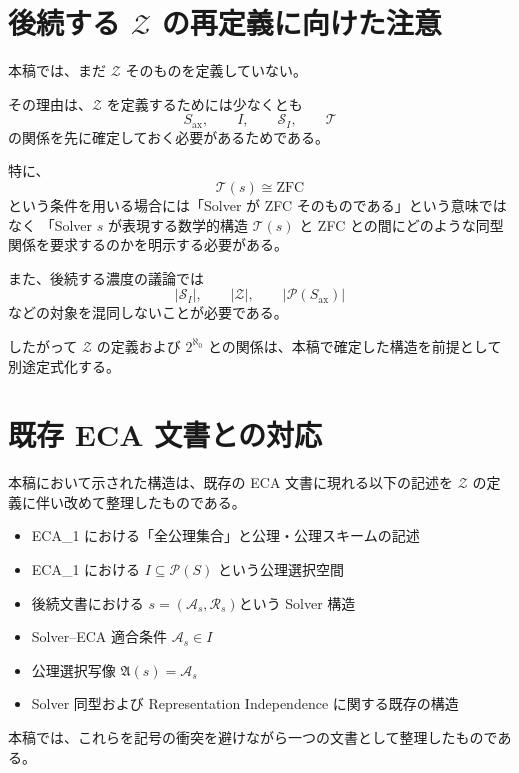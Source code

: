 \documentclass[a4paper,11pt]{jsarticle}
\newcommand{\Solver}{\mathcal{S}}
\newcommand{\Ax}{S_{\mathrm{ax}}}
\newcommand{\Sel}{I}
\begin{document}
\section{後続する $\mathcal{Z}$ の再定義に向けた注意}

本稿では、まだ $\mathcal{Z}$ そのものを定義していない。

その理由は、$\mathcal{Z}$ を定義するためには少なくとも
\[
\Ax,\qquad
\Sel,\qquad
\Solver_{\Sel},\qquad
\mathcal{T}
\]
の関係を先に確定しておく必要があるためである。

特に、
\[
\mathcal{T}(s)\cong\mathrm{ZFC}
\]
という条件を用いる場合には「Solver が ZFC そのものである」という意味ではなく 「Solver $s$ が表現する数学的構造 $\mathcal{T}(s)$ と ZFC との間にどのような同型関係を要求するのかを明示する必要がある。

また、後続する濃度の議論では
\[
|\Solver_{\Sel}|,
\qquad
|\mathcal{Z}|,
\qquad
|\mathcal{P}(\Ax)|
\]
などの対象を混同しないことが必要である。

したがって $\mathcal{Z}$ の定義および $2^{\aleph_0}$ との関係は、本稿で確定した構造を前提として別途定式化する。

\section*{既存 ECA 文書との対応}

本稿において示された構造は、既存の ECA 文書に現れる以下の記述を $\mathcal{Z}$ の定義に伴い改めて整理したものである。

\begin{itemize}
\item ECA_1 における「全公理集合」と公理・公理スキームの記述
\item ECA_1 における $I\subseteq\mathcal{P}(S)$ という公理選択空間
\item 後続文書における $s=(\mathcal{A}_s,\mathcal{R}_s)$という Solver 構造
\item Solver--ECA 適合条件 $\mathcal{A}_s\in I$
\item 公理選択写像 $\mathfrak{A}(s)=\mathcal{A}_s$
\item Solver 同型および Representation Independence に関する既存の構造
\end{itemize}

本稿では、これらを記号の衝突を避けながら一つの文書として整理したものである。
\end{document}
